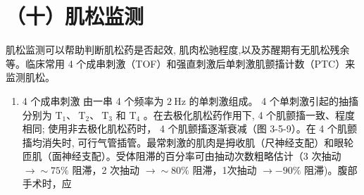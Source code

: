 \documentclass[10pt]{article}
\begin{document}
\section*{（十）肌松监测}
肌松监测可以帮助判断肌松药是否起效, 肌肉松驰程度,以及苏醒期有无肌松残余等。临床常用 4 个成串刺激（TOF）和强直刺激后单刺激肌颤搐计数（PTC）来监测肌松。

\begin{enumerate}
  \item 4 个成串刺激 由一串 4 个频率为 $2 \mathrm{~Hz}$ 的单刺激组成。 4 个单刺激引起的抽搐分别为 $\mathrm{T}_{1} 、 \mathrm{~T}_{2} 、 \mathrm{~T}_{3}$ 和 $\mathrm{T}_{4}$ 。在去极化肌松药作用下, 4 个肌颤搐一致、程度相同; 使用非去极化肌松药时， 4 个肌颤搐逐渐衰减（图 3-5-9）。在 4 个肌颤搐均消失时, 可行气管插管。最常刺激的肌肉是拇收肌（尺神经支配）和眼轮匝肌（面神经支配）。受体阻滞的百分率可由抽动次数粗略估计（3 次抽动 $\rightarrow \sim 75 \%$ 阻滞，2 次抽动 $\rightarrow \sim 80 \%$ 阻滞，1次抽动 $\rightarrow-90 \%$ 阻滞)。腹部手术时，应
\end{enumerate}
\end{document}
